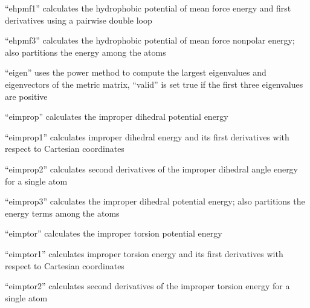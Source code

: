 \documentclass[letterpaper,11pt,english]{sphinxmanual}
\begin{document}
“ehpmf1” calculates the hydrophobic potential of mean force
energy and first derivatives using a pairwise double loop


“ehpmf3” calculates the hydrophobic potential of mean force
nonpolar energy; also partitions the energy among the atoms


“eigen” uses the power method to compute the largest eigenvalues
and eigenvectors of the metric matrix, “valid” is set true if the
first three eigenvalues are positive







“eimprop” calculates the improper dihedral potential energy


“eimprop1” calculates improper dihedral energy and its
first derivatives with respect to Cartesian coordinates


“eimprop2” calculates second derivatives of the improper
dihedral angle energy for a single atom


“eimprop3” calculates the improper dihedral potential
energy; also partitions the energy terms among the atoms


“eimptor” calculates the improper torsion potential energy


“eimptor1” calculates improper torsion energy and its
first derivatives with respect to Cartesian coordinates


“eimptor2” calculates second derivatives of the improper
torsion energy for a single atom

\end{document}
